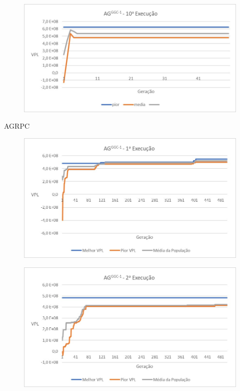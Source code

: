 \documentclass[12pt,a4paper]{report}
\begin{document}
\begin{figure}[H]
\centering

\includegraphics[scale=1]{GCC/10}
\end{figure}

AGRPC

\begin{figure}[H]
\centering

\includegraphics[scale=1]{AGRPC/1}
\end{figure}

\begin{figure}[H]
\centering

\includegraphics[scale=1]{AGRPC/2}
\end{figure}
\end{document}
